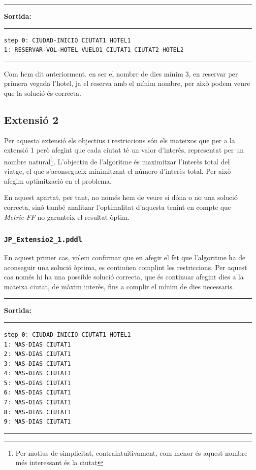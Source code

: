 \documentclass[11pt,a4paper]{article}
\begin{document}
\begin{samepage}
\medskip
\noindent
\rule{0.1\textwidth}{0.5mm}
\textbf{Sortida:}
\rule{0.76\textwidth}{0.5mm}
\begin{verbatim}
step 0: CIUDAD-INICIO CIUTAT1 HOTEL1
1: RESERVAR-VOL-HOTEL VUELO1 CIUTAT1 CIUTAT2 HOTEL2
\end{verbatim}
\rule{\textwidth}{0.5mm}
\medskip
\end{samepage}

Com hem dit anteriorment, en ser el nombre de dies mínim 3, en reservar per primera vegada l'hotel, ja el reserva amb el mínim nombre, per això podem veure que la solució és correcta.

\subsection{Extensió 2}

Per aquesta extensió els objectius i restriccions són els mateixos que per a  la extensió 1 però afegint que cada ciutat té un valor d'interès, representat per un nombre natural\footnote{Per motius de simplicitat, contraintuitivament, com menor és aquest nombre més interessant és la ciutat}. L'objectiu de l'algoritme és maximitzar l'interès total del viatge, el que s'aconsegueix minimitzant el número d'interès total. Per això afegim optimització en el problema. 

En aquest apartat, per tant, no només hem de veure si dóna o no una solució correcta, sinó també analitzar l'optimalitat d'aquesta tenint en compte que \emph{Metric-FF} no garanteix el resultat òptim. 

\subsubsection*{\texttt{JP\_Extensio2\_1.pddl}}

En aquest primer cas, volem confirmar que en afegir el fet que l'algoritme ha de aconseguir una solució òptima, es continüen complint les restriccions. Per aquest cas només hi ha una possible solució correcta, que és continuar afegint dies a la mateixa ciutat, de màxim interès, fins a complir el mínim de dies necessaris.

\begin{samepage}
\medskip
\noindent
\rule{0.1\textwidth}{0.5mm}
\textbf{Sortida:}
\rule{0.76\textwidth}{0.5mm}
\begin{verbatim}
step 0: CIUDAD-INICIO CIUTAT1 HOTEL1
1: MAS-DIAS CIUTAT1
2: MAS-DIAS CIUTAT1
3: MAS-DIAS CIUTAT1
4: MAS-DIAS CIUTAT1
5: MAS-DIAS CIUTAT1
6: MAS-DIAS CIUTAT1
7: MAS-DIAS CIUTAT1
8: MAS-DIAS CIUTAT1
9: MAS-DIAS CIUTAT1
\end{verbatim}
\rule{\textwidth}{0.5mm}
\medskip
\end{samepage}
\end{document}
